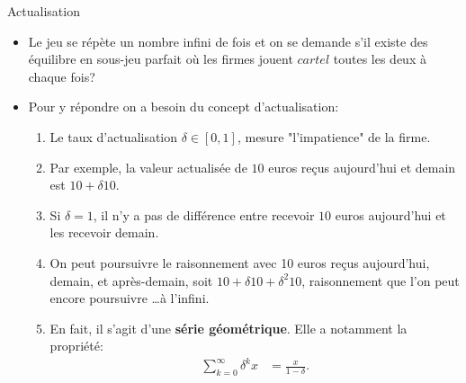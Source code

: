 \begin{frame}[allowframebreaks]{Actualisation}
\begin{itemize}
    \item Le jeu se répète un nombre infini de fois et on se demande 
    s'il existe des équilibre en sous-jeu parfait où les firmes jouent $cartel$
     toutes les deux à chaque fois?
     \item Pour y répondre on a besoin du concept d'actualisation:
     \begin{enumerate}[-]
         \item Le taux d'actualisation $\delta \in [0, 1]$, mesure "l'impatience" de la firme.
         \item Par exemple, la valeur actualisée de  $10$ euros reçus aujourd'hui et demain 
         est $10 + \delta 10$.
         \item Si $\delta = 1$, il n'y a pas de différence entre recevoir $10$ euros aujourd'hui et les 
         recevoir demain.
         \item On peut poursuivre le raisonnement avec  10 euros reçus aujourd'hui, demain, et après-demain, soit
         $10 + \delta 10 + \delta^2 10$, raisonnement que l'on peut encore poursuivre \ldots à l'infini.
         \item En fait, il s'agit d'une \textbf{série géométrique}. Elle a notamment la propriété:
         \begin{align*}
             \sum_{k = 0}^\infty \delta^k x &= \frac{x}{1-\delta}.
         \end{align*}
     \end{enumerate}
\end{itemize}
\end{frame}

